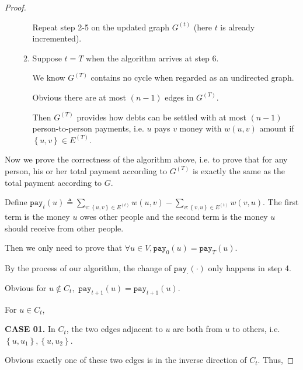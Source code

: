 \documentclass{article}
\newcommand{\set}[1]{\left\{#1\right\}}
\begin{document}
\begin{proof}
\begin{itemize}
\begin{enumerate}
        Repeat step 2-5 on the updated graph $G^{(t)}$ (here $t$ is already incremented).
        
        \item Suppose $t=T$ when the algorithm arrives at step 6. 
        
        We know $G^{(T)}$ contains no cycle when regarded as an undirected graph. 
        
        Obvious there are at most $(n-1)$ edges in $G^{(T)}$. 
        
        Then $G^{(T)}$ provides how debts can be settled with at most $(n-1)$ person-to-person payments, i.e. $u$ pays $v$ money with $w(u,v)$ amount if $\set{u,v}\in E^{(T)}$.
        
    \end{enumerate}
    \end{itemize}
    
    \vspace{1.5em} \hspace{1.3em}
    Now we prove the correctness of the algorithm above, i.e. to prove that for any person, his or her total payment according to $G^{(T)}$ is exactly the same as the total payment according to $G$.
    
    \hspace{1.3em}
    Define $\mathtt{pay}_{t}(u)\triangleq\sum_{v:\set{u,v}\in E^{(t)}}w(u,v)-\sum_{v:\set{v,u}\in E^{(t)}}w(v,u)$. The first term is the money $u$ owes other people and the second term is the money $u$ should receive from other people.
    
    \hspace{1.3em}
    Then we only need to prove that $\forall u\in V, \mathtt{pay}_0(u)=\mathtt{pay}_T(u).$
    
    \hspace{1.3em}
    By the process of our algorithm, the change of $\mathtt{pay}_{\cdot}(\cdot)$ only happens in step 4.
    
    \hspace{1.3em}
    Obvious for $u\notin C_t,$ $\mathtt{pay}_{t+1}(u)=\mathtt{pay}_{t+1}(u)$.
    
    \hspace{1.3em}
    For $u\in C_t$, 
    
    \hspace{1.3em}
    \textbf{CASE 01.} In $C_t$, the two edges adjacent to $u$ are both from $u$ to others, i.e. $\set{u,u_1}, \set{u,u_2}$. 
    
    \hspace{6.75em}
    Obvious exactly one of these two edges is in the inverse direction of $C_t$. Thus,
    

\end{proof}
\end{document}
